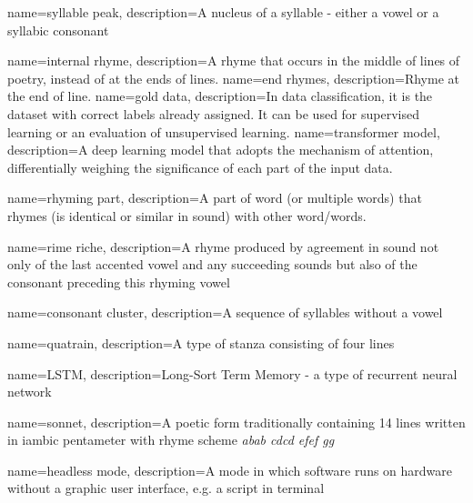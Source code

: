 
{
	name=syllable peak,
	description={A nucleus of a syllable - either a vowel or a syllabic consonant}
}

{
	name={internal rhyme},
	description={A rhyme that occurs in the middle of lines of poetry, instead of at the ends of lines.}
}
{
	name={end rhymes},
	description={Rhyme at the end of line.}
}
{
	name={gold data},
	description={In data classification, it is the dataset with correct labels already assigned. It can be used for supervised learning or an evaluation of unsupervised learning.}
}
{
	name=transformer model,
	description={A deep learning model that adopts the mechanism of attention, differentially weighing the significance of each part of the input data.}
}

{
	name=rhyming part,
	description={A part of word (or multiple words) that rhymes (is identical or similar in sound) with other word/words.}
}


{
	name=rime riche,
	description={A rhyme produced by agreement in sound not only of the last accented vowel and any succeeding sounds but also of the consonant preceding this rhyming vowel}
}


{
	name=consonant cluster,
	description={A sequence of syllables without a vowel}
}

{
	name=quatrain,
	description={A type of stanza consisting of four lines}
}

{
	name=LSTM,
	description={Long-Sort Term Memory - a type of recurrent neural network}
}

{
	name=sonnet,
	description={A poetic form traditionally containing 14 lines written in iambic pentameter with rhyme scheme \textit{abab cdcd efef gg}}
}

{
	name=headless mode,
	description={A mode in which software runs on hardware without a graphic user interface, e.g. a script in terminal}
}